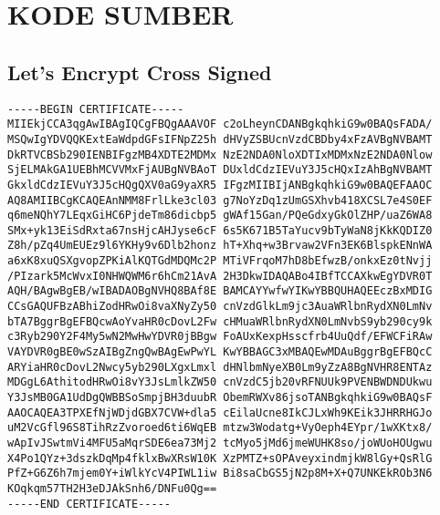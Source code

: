 \chapter{KODE SUMBER}

\section*{Let's Encrypt Cross Signed}
\begin{lstlisting}[frame=single,tabsize=2,breaklines,caption={Let's Encrypt X3 Cross Signed.pem},label=letsencryptpem, captionpos=b]
-----BEGIN CERTIFICATE-----
MIIEkjCCA3qgAwIBAgIQCgFBQgAAAVOF c2oLheynCDANBgkqhkiG9w0BAQsFADA/
MSQwIgYDVQQKExtEaWdpdGFsIFNpZ25h dHVyZSBUcnVzdCBDby4xFzAVBgNVBAMT
DkRTVCBSb290IENBIFgzMB4XDTE2MDMx NzE2NDA0NloXDTIxMDMxNzE2NDA0Nlow
SjELMAkGA1UEBhMCVVMxFjAUBgNVBAoT DUxldCdzIEVuY3J5cHQxIzAhBgNVBAMT
GkxldCdzIEVuY3J5cHQgQXV0aG9yaXR5 IFgzMIIBIjANBgkqhkiG9w0BAQEFAAOC
AQ8AMIIBCgKCAQEAnNMM8FrlLke3cl03 g7NoYzDq1zUmGSXhvb418XCSL7e4S0EF
q6meNQhY7LEqxGiHC6PjdeTm86dicbp5 gWAf15Gan/PQeGdxyGkOlZHP/uaZ6WA8
SMx+yk13EiSdRxta67nsHjcAHJyse6cF 6s5K671B5TaYucv9bTyWaN8jKkKQDIZ0
Z8h/pZq4UmEUEz9l6YKHy9v6Dlb2honz hT+Xhq+w3Brvaw2VFn3EK6BlspkENnWA
a6xK8xuQSXgvopZPKiAlKQTGdMDQMc2P MTiVFrqoM7hD8bEfwzB/onkxEz0tNvjj
/PIzark5McWvxI0NHWQWM6r6hCm21AvA 2H3DkwIDAQABo4IBfTCCAXkwEgYDVR0T
AQH/BAgwBgEB/wIBADAOBgNVHQ8BAf8E BAMCAYYwfwYIKwYBBQUHAQEEczBxMDIG
CCsGAQUFBzABhiZodHRwOi8vaXNyZy50 cnVzdGlkLm9jc3AuaWRlbnRydXN0LmNv
bTA7BggrBgEFBQcwAoYvaHR0cDovL2Fw cHMuaWRlbnRydXN0LmNvbS9yb290cy9k
c3Ryb290Y2F4My5wN2MwHwYDVR0jBBgw FoAUxKexpHsscfrb4UuQdf/EFWCFiRAw
VAYDVR0gBE0wSzAIBgZngQwBAgEwPwYL KwYBBAGC3xMBAQEwMDAuBggrBgEFBQcC
ARYiaHR0cDovL2Nwcy5yb290LXgxLmxl dHNlbmNyeXB0Lm9yZzA8BgNVHR8ENTAz
MDGgL6AthitodHRwOi8vY3JsLmlkZW50 cnVzdC5jb20vRFNUUk9PVENBWDNDUkwu
Y3JsMB0GA1UdDgQWBBSoSmpjBH3duubR ObemRWXv86jsoTANBgkqhkiG9w0BAQsF
AAOCAQEA3TPXEfNjWDjdGBX7CVW+dla5 cEilaUcne8IkCJLxWh9KEik3JHRRHGJo
uM2VcGfl96S8TihRzZvoroed6ti6WqEB mtzw3Wodatg+VyOeph4EYpr/1wXKtx8/
wApIvJSwtmVi4MFU5aMqrSDE6ea73Mj2 tcMyo5jMd6jmeWUHK8so/joWUoHOUgwu
X4Po1QYz+3dszkDqMp4fklxBwXRsW10K XzPMTZ+sOPAveyxindmjkW8lGy+QsRlG
PfZ+G6Z6h7mjem0Y+iWlkYcV4PIWL1iw Bi8saCbGS5jN2p8M+X+Q7UNKEkROb3N6
KOqkqm57TH2H3eDJAkSnh6/DNFu0Qg==
-----END CERTIFICATE-----
	\end{lstlisting}
